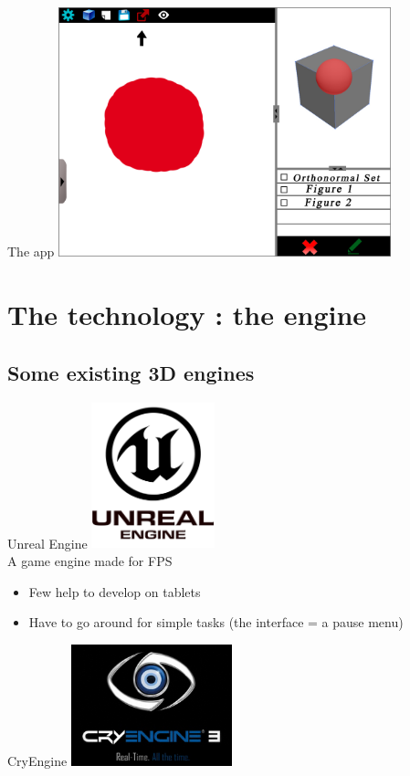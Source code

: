 \documentclass[a4paper,10pt]{beamer}
\begin{document}
			\begin{frame}{The app}
				\includegraphics[height=205pt]{maquette/maquette_8.png}
			\end{frame}
	
	\section{The technology : the engine}
	
		
			
		\subsection{Some existing 3D engines}
		
			\begin{frame}{Unreal Engine}
				\includegraphics[height=120pt]{images/logos/Unreal_Engine.png}\\
				A game engine made for FPS
				\begin{itemize}
					\item Few help to develop on tablets
					\item Have to go around for simple tasks (the interface = a pause menu)
				\end{itemize}
			\end{frame}
			
			\begin{frame}{CryEngine}
				\includegraphics[height=100pt]{images/logos/Cry_Engine.png}
			\end{frame}
			
\end{document}
